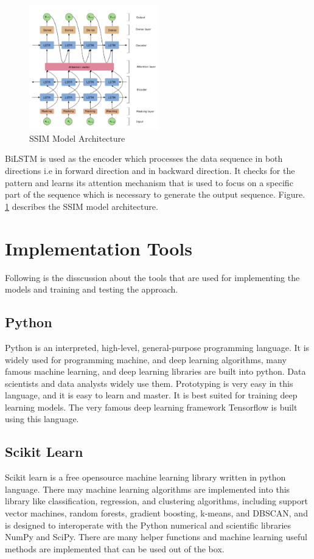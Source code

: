 \begin{figure}[ht]
	\centering
	\includegraphics[width=0.5\textwidth]{images/ssim.png}
	\caption{SSIM Model Architecture}
	\label{fig:ssim}
\end{figure}

BiLSTM is used as the encoder which processes the data sequence in both directions i.e in forward direction and in backward direction. It checks for the pattern and learns its attention mechanism that  is used to focus on a specific part of the sequence which is necessary to generate the output sequence. Figure. \ref{fig:ssim} describes the SSIM model architecture.


\section{Implementation Tools}
Following is the disscussion about the tools that are used for implementing the models and training and testing the approach.

\subsection{Python}
Python is an interpreted, high-level, general-purpose programming language. It is widely used for programming machine, and deep learning algorithms, many famous machine learning, and deep learning libraries are built into python. Data scientists and data analysts widely use them. Prototyping is very easy in this language, and it is easy to learn and master. It is best suited for training deep learning models. The very famous deep learning framework Tensorflow is built using this language.

\subsection{Scikit Learn}
Scikit learn is a free opensource machine learning library written in python language. There may machine learning algorithms are implemented into this library like classification, regression, and clustering algorithms, including support vector machines, random forests, gradient boosting, k-means, and DBSCAN, and is designed to interoperate with the Python numerical and scientific libraries NumPy and SciPy. There are many helper functions and machine learning useful methods are implemented that can be used out of the box.

